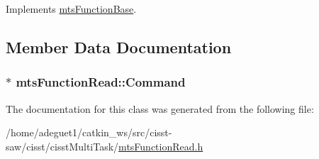 Implements \hyperlink{classmts_function_base_ae6e5497be34d5563f2df3cb24d68e959}{mts\-Function\-Base}.



\subsection{Member Data Documentation}
\hypertarget{classmts_function_read_a42b24c58d52e1f0a2aa8bacaebc0f8b3}{
\subsubsection[{Command}]{$\ast$ mts\-Function\-Read\-::\-Command\hspace{0.3cm}{\ttfamily [protected]}}}\label{classmts_function_read_a42b24c58d52e1f0a2aa8bacaebc0f8b3}


The documentation for this class was generated from the following file\-:\begin{DoxyCompactItemize}
\item 
/home/adeguet1/catkin\-\_\-ws/src/cisst-\/saw/cisst/cisst\-Multi\-Task/\hyperlink{mts_function_read_8h}{mts\-Function\-Read.\-h}\end{DoxyCompactItemize}
